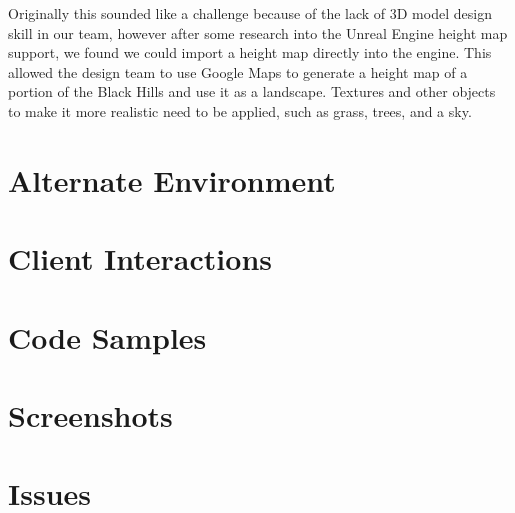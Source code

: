 \documentclass[11pt]{book}
\begin{document}
Originally this sounded like a challenge because of the lack of 3D model design skill in our team, however after some research into the Unreal Engine height map support, we found we could import a height map directly into the engine.  This allowed the design team to use Google Maps to generate a height map of a portion of the Black Hills and use it as a landscape.  Textures and other objects to make it more realistic need to be applied, such as grass, trees, and a sky. 
 
\section*{Alternate Environment}


\section*{Client Interactions}


\section*{Code Samples}

	
\section*{Screenshots}
	

\section*{Issues}
\end{document}
